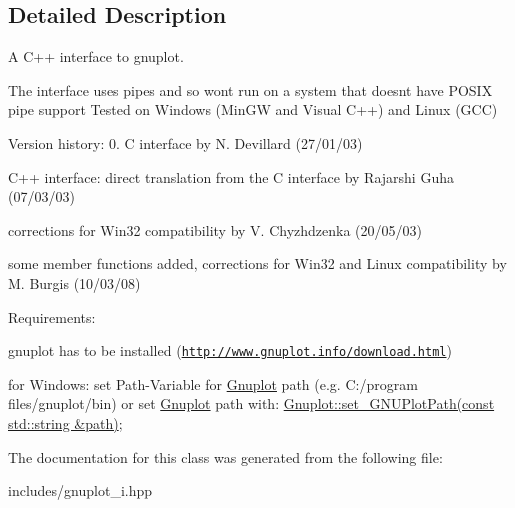 \subsection{Detailed Description}
A C++ interface to gnuplot. 

The interface uses pipes and so won\textquotesingle{}t run on a system that doesn\textquotesingle{}t have P\+O\+S\+IX pipe support Tested on Windows (Min\+GW and Visual C++) and Linux (G\+CC)

Version history\+: 0. C interface by N. Devillard (27/01/03)
\begin{DoxyEnumerate}
\item C++ interface\+: direct translation from the C interface by Rajarshi Guha (07/03/03)
\item corrections for Win32 compatibility by V. Chyzhdzenka (20/05/03)
\item some member functions added, corrections for Win32 and Linux compatibility by M. Burgis (10/03/08)
\end{DoxyEnumerate}

Requirements\+:
\begin{DoxyItemize}
\item gnuplot has to be installed (\href{http://www.gnuplot.info/download.html}{\tt http\+://www.\+gnuplot.\+info/download.\+html})
\item for Windows\+: set Path-\/\+Variable for \hyperlink{class_gnuplot}{Gnuplot} path (e.\+g. C\+:/program files/gnuplot/bin) or set \hyperlink{class_gnuplot}{Gnuplot} path with\+: \hyperlink{class_gnuplot_a67cae885c26ced821e335d98986f1967}{Gnuplot\+::set\+\_\+\+G\+N\+U\+Plot\+Path(const std\+::string \&path)}; 
\end{DoxyItemize}

The documentation for this class was generated from the following file\+:\begin{DoxyCompactItemize}
\item 
includes/gnuplot\+\_\+i.\+hpp\end{DoxyCompactItemize}
